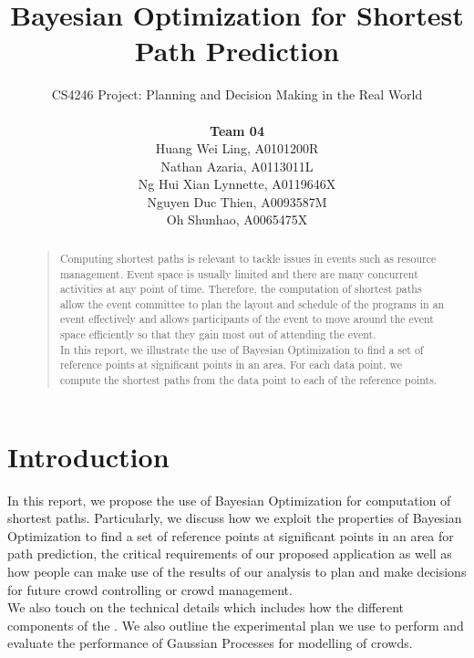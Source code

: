 \documentclass[letterpaper]{article}
\begin{document}
%
\title{Bayesian Optimization for Shortest Path Prediction}
\author{CS4246 Project: Planning and Decision Making in the Real World  \\ \\
{\bf Team 04} \\
Huang Wei Ling, A0101200R\\
Nathan Azaria, A0113011L\\
Ng Hui Xian Lynnette, A0119646X\\
Nguyen Duc Thien, A0093587M\\
Oh Shunhao, A0065475X\\
}
\maketitle
\begin{abstract}
\begin{quote}
Computing shortest paths is relevant to tackle issues in events such as resource management. Event space is usually limited and there are many concurrent activities at any point of time. Therefore, the computation of shortest paths allow the event committee to plan the layout and schedule of the programs in an event effectively and allows participants of the event to move around the event space efficiently so that they gain most out of attending the event. \\

In this report, we illustrate the use of Bayesian Optimization to find a set of reference points at significant points in an area. For each data point, we compute the shortest paths from the data point to each of the reference points.
\end{quote}
\end{abstract}

\section{Introduction}
In this report, we propose the use of Bayesian Optimization for computation of shortest paths. Particularly, we discuss how we exploit the properties of Bayesian Optimization to find a set of reference points at significant points in an area for path prediction, the critical requirements of our proposed application as well as how people can make use of the results of our analysis to plan and make decisions for future crowd controlling or crowd management. \\

We also touch on the technical details which includes how the different components of the . We also outline the experimental plan we use to perform and evaluate the performance of Gaussian Processes for modelling of crowds. \\
\end{document}
